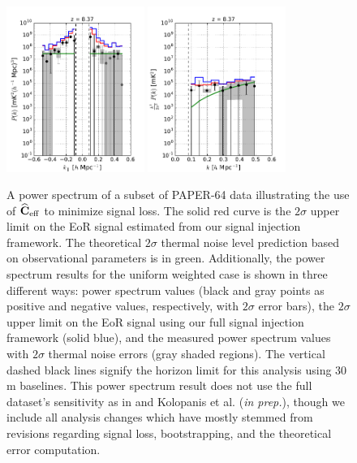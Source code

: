 \documentclass[preprint2,numberedappendix,tighten]{aastex6}  %
\begin{document}
\begin{figure}
	\centering
	\includegraphics[width=0.4\textwidth]{plots/ps1_data_add.pdf}
	\includegraphics[width=0.4\textwidth]{plots/ps2_data_add.pdf}
	\caption{A power spectrum of a subset of PAPER-64 data illustrating the use of $\widehat{\textbf{C}}_{\rm eff}$ to minimize signal loss. The solid red curve is the $2\sigma$ upper limit on the EoR signal estimated from our signal injection framework. The theoretical $2\sigma$ thermal noise level prediction based on observational parameters is in green. Additionally, the power spectrum results for the uniform weighted case is shown in three different ways: power spectrum values (black and gray points as positive and negative values, respectively, with $2\sigma$ error bars), the $2\sigma$ upper limit on the EoR signal using our full signal injection framework (solid blue), and the measured power spectrum values with $2\sigma$ thermal noise errors (gray shaded regions). The vertical dashed black lines signify the horizon limit for this analysis using $30$\,m baselines. This power spectrum result does not use the full dataset's sensitivity as in  and Kolopanis et al. (\textit{in prep.}), though we include all analysis changes which have mostly stemmed from revisions regarding signal 
loss, bootstrapping, and the theoretical error computation.}
	\label{fig:ps1_data}
\end{figure}
\end{document}
